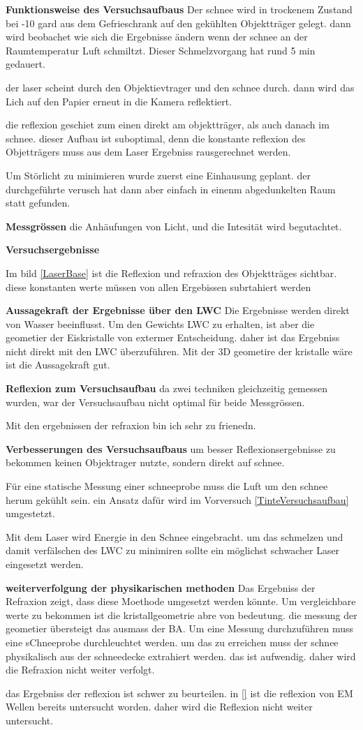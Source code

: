 \textbf{Funktionsweise des Versuchsaufbaus}
Der schnee wird in trockenem Zustand bei -10 gard aus dem Gefrieschrank auf den gekühlten Objektträger gelegt. dann wird beobachet wie sich die Ergebnisse ändern wenn der schnee an der Raumtemperatur Luft schmiltzt. Dieser Schmelzvorgang hat rund 5 min gedauert.

der laser scheint durch den Objektievtrager und den schnee durch. dann wird das Lich auf den Papier erneut in die Kamera reflektiert.

die reflexion geschiet zum einen direkt am objektträger, als auch danach im schnee. dieser Aufbau ist suboptimal, denn die konstante reflexion des Objetträgers muss aus dem Laser Ergebniss rausgerechnet werden.

Um Störlicht zu minimieren wurde zuerst eine Einhausung geplant. der durchgeführte verusch hat dann aber einfach in einenm abgedunkelten Raum statt gefunden.

\textbf{Messgrössen}
die Anhäufungen von Licht, und die Intesität wird begutachtet.

\textbf{Versuchsergebnisse}

Im bild \ref{LaserBase} ist die Reflexion und refraxion des Objektträges sichtbar. diese konstanten werte müssen von allen Ergebissen subrtahiert werden

\textbf{Aussagekraft der Ergebnisse über den LWC} Die Ergebnisse werden direkt von Wasser beeinflusst. Um den Gewichts LWC zu erhalten, ist aber die geometier der Eiskristalle von extermer Entscheidung. daher ist das Ergebniss nicht direkt mit den LWC überzuführen. Mit der 3D geometire der kristalle wäre ist die Aussagekraft gut.

\textbf{Reflexion zum Versuchsaufbau}
da zwei techniken gleichzeitig gemessen wurden, war der Versuchsaufbau nicht optimal für beide Messgrössen.

Mit den ergebnissen der refraxion bin ich sehr zu frienedn.

\textbf{Verbesserungen des Versuchsaufbaus}
um besser Reflexionsergebnisse zu bekommen keinen Objektrager nutzte, sondern direkt auf schnee.

Für eine statische Messung einer schneeprobe muss die Luft um den schnee herum gekühlt sein. ein Ansatz dafür wird im Vorversuch \ref{TinteVersuchsaufbau} umgestetzt.

Mit dem Laser wird Energie in den Schnee eingebracht. um das schmelzen und damit verfälschen des LWC zu minimiren sollte ein möglichst schwacher Laser eingesetzt werden.

\textbf{weiterverfolgung der physikarischen methoden}
Das Ergebniss der Refraxion zeigt, dass diese Moethode umgesetzt werden könnte. Um vergleichbare werte zu bekommen ist die kristallgeometrie abre von bedeutung. die messung der geometier übersteigt das ausmass der BA. Um eine Messung durchzuführen muss eine sChneeprobe durchleuchtet werden. um das zu erreichen muss der schnee physikalisch aus der schneedecke extrahiert werden. das ist aufwendig. daher wird die Refraxion nicht weiter verfolgt.

das Ergebniss der reflexion ist schwer zu beurteilen. in \ref{} ist die reflexion von EM Wellen bereits untersucht worden. daher wird die Reflexion nicht weiter untersucht.


